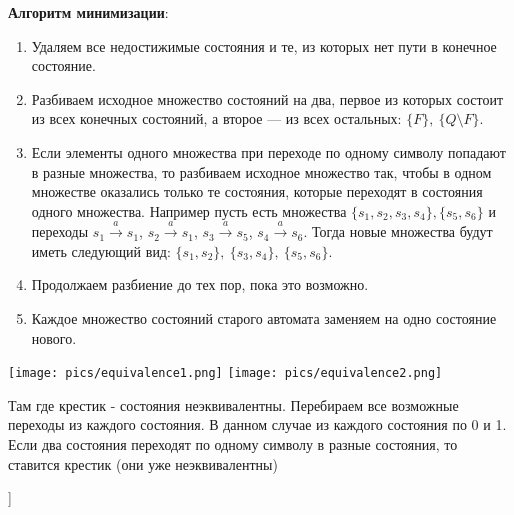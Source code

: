 \textbf{Алгоритм минимизации}:
\begin{enumerate}
    \item Удаляем все недостижимые состояния и те, из которых нет пути в конечное состояние.
    \item Разбиваем исходное множество состояний на два, первое из которых состоит из всех конечных состояний, а второе --- из всех остальных: $\{F\},~\{Q \setminus F\}$.
    \item Если элементы одного множества при переходе по одному символу попадают в разные множества, то разбиваем исходное множество так, чтобы в одном множестве оказались только те состояния, которые переходят в состояния одного множества.
    Например пусть есть множества $\{s_1,s_2,s_3,s_4\},\{s_5,s_6\}$ и переходы $s_1 \xrightarrow{a} s_1$, $s_2 \xrightarrow{a} s_1$, $s_3 \xrightarrow{a} s_5$, $s_4 \xrightarrow{a} s_6$.
    Тогда новые множества будут иметь следующий вид: $\{s_1,s_2\},~\{s_3,s_4\},~\{s_5,s_6\}$.
    \item Продолжаем разбиение до тех пор, пока это возможно.
    \item Каждое множество состояний старого автомата заменяем на одно состояние нового.
\end{enumerate}

\texttt{[image: pics/equivalence1.png]}
\texttt{[image: pics/equivalence2.png]}

Там где крестик - состояния неэквивалентны. Перебираем все возможные переходы из каждого состояния. В данном случае из каждого состояния по 0 и 1. Если два состояния переходят по одному символу в разные состояния, то ставится крестик (они уже неэквивалентны)

    


\bigbreak
[\cite[page 25-37]{ignatiev4}]